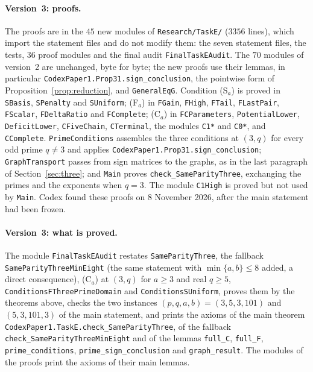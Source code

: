 \documentclass[11pt]{article}
\theoremstyle{remark}
\begin{document}
\paragraph{Version~3: proofs.}
The proofs are in the $45$ new modules of \texttt{Research/TaskE/} ($3356$ lines),
which import the statement files and do not modify them: the seven statement files,
the tests, $36$ proof modules and the final audit \texttt{FinalTaskEAudit}. The
$70$ modules of version~2 are unchanged, byte for byte; the new proofs use their
lemmas, in particular \texttt{CodexPaper1.Prop31.sign\_conclusion}, the pointwise
form of Proposition~\ref{prop:reduction}, and \texttt{GeneralEqG}. Condition
(S$_a$) is proved in \texttt{SBasis}, \texttt{SPenalty} and \texttt{SUniform};
(F$_a$) in \texttt{FGain}, \texttt{FHigh}, \texttt{FTail}, \texttt{FLastPair},
\texttt{FScalar}, \texttt{FDeltaRatio} and \texttt{FComplete}; (C$_a$) in
\texttt{FCParameters}, \texttt{PotentialLower}, \texttt{DeficitLower},
\texttt{CFiveChain}, \texttt{CTerminal}, the modules \texttt{C1*} and \texttt{C0*},
and \texttt{CComplete}. \texttt{PrimeConditions} assembles the three conditions at
$(3,q)$ for every odd prime $q\ne3$ and applies
\texttt{CodexPaper1.Prop31.sign\_conclusion}; \texttt{GraphTransport} passes from
sign matrices to the graphs, as in the last paragraph of Section~\ref{sec:three};
and \texttt{Main} proves \texttt{check\_SameParityThree}, exchanging the primes and
the exponents when $q=3$. The module \texttt{C1High} is proved but not used by
\texttt{Main}. Codex found these proofs on 8 November 2026, after the main statement had been
frozen.

\paragraph{Version~3: what is proved.}
The module \texttt{FinalTaskEAudit} restates \texttt{SameParityThree}, the
fallback \texttt{SameParityThreeMinEight} (the same statement with
$\min\{a,b\}\le8$ added, a direct consequence), (C$_a$) at $(3,q)$ for $a\ge3$ and
real $q\ge5$, \texttt{ConditionsFThreePrimeDomain} and \texttt{ConditionsSUniform},
proves them by the theorems above, checks the two instances $(p,q,a,b)=(3,5,3,101)$
and $(5,3,101,3)$ of the main statement, and prints the axioms of the main theorem
\texttt{CodexPaper1.TaskE.check\_SameParityThree}, of the fallback
\texttt{check\_SameParityThreeMinEight} and of the lemmas
\texttt{full\_C}, \texttt{full\_F}, \texttt{prime\_conditions},
\texttt{prime\_sign\_conclusion} and \texttt{graph\_result}. The modules of the
proofs print the axioms of their main lemmas.
\end{document}
